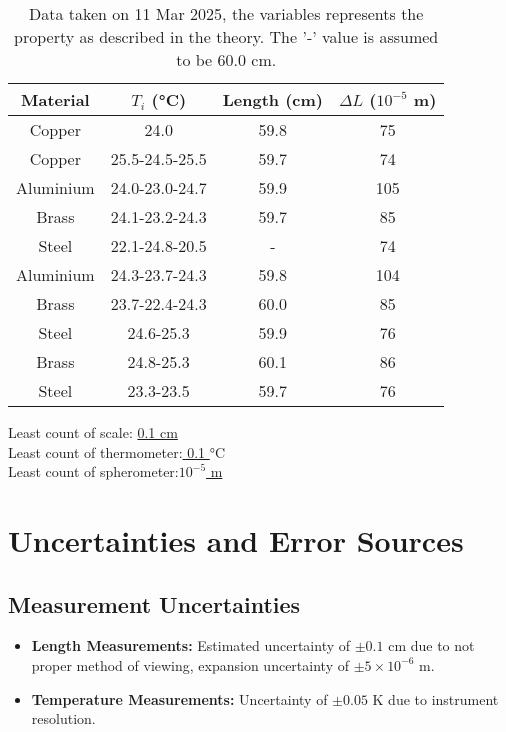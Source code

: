 \documentclass[%
 sor,
 jor,
 amsmath,amssymb,
 reprint,
]{revtex4-2}
\begin{document}
\begin{table}[h]
\centering
\begin{tabular}{|c|ccc|}
    \hline
    Material & $T_i$ (\si{\celsius})  & Length (cm) & $\Delta L$ ($10^{-5}$ m)\\
    \hline
    Copper 	& 24.0     & 59.8 & 75 \\
    Copper 	& 25.5-24.5-25.5 & 59.7 & 74\\
    Aluminium 	& 24.0-23.0-24.7 & 59.9 & 105\\
    Brass 	& 24.1-23.2-24.3 & 59.7 & 85 \\
    Steel 	& 22.1-24.8-20.5 & - & 74 \\
    Aluminium 	& 24.3-23.7-24.3 & 59.8 & 104\\
    Brass 	& 23.7-22.4-24.3 & 60.0 & 85 \\
    Steel 	& 24.6-25.3 & 59.9 & 76 \\
    Brass	& 24.8-25.3 & 60.1 & 86 \\
    Steel 	& 23.3-23.5 & 59.7 & 76 \\ 
    \hline
\end{tabular}
\caption{Data taken on 11 Mar 2025, the variables represents the property as described in the theory. The '-' value is assumed to be 60.0 cm.}

\end{table}
\noindent Least count of scale: \uline{0.1 cm}  \\
Least count of thermometer:\uline{ 0.1 $\si{\celsius}$ }\\
Least count of spherometer:\uline{$10^{-5}$ m } \\


\section{Uncertainties and Error Sources}
\subsection{Measurement Uncertainties}
\begin{itemize}
    \item \textbf{Length Measurements:} Estimated uncertainty of $\pm 0.1$ cm due to not proper method of viewing, expansion uncertainty of $\pm 5\times 10^{-6}$ m.
    \item \textbf{Temperature Measurements:} Uncertainty of $\pm 0.05$ \si{\kelvin} due to instrument resolution.
\end{itemize}
\end{document}

